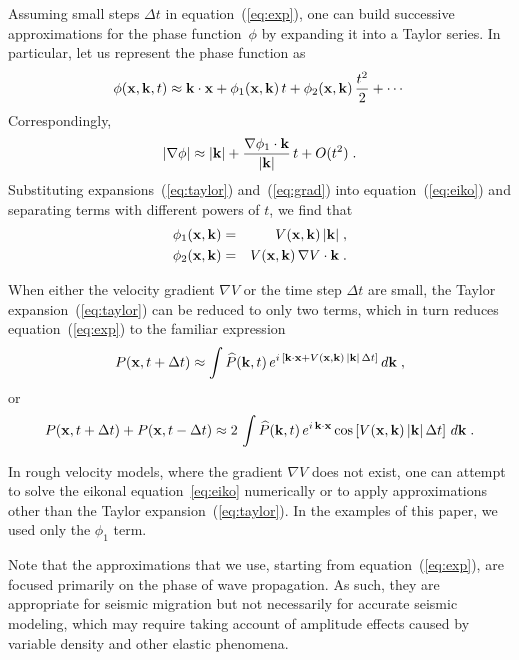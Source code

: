 Assuming small steps $\Delta t$ in equation~(\ref{eq:exp}), one can
build successive approximations for the phase function~$\phi$ by
expanding it into a Taylor series. In particular, let us represent the
phase function as
\begin{equation}
  \label{eq:taylor}
  \phi(\mathbf{x},\mathbf{k},t) \approx  \mathbf{k} \cdot \mathbf{x} + \phi_1(\mathbf{x},\mathbf{k})\,t + \phi_2(\mathbf{x},\mathbf{k})\,\frac{t^2}{2} + \cdots
\end{equation}
Correspondingly,
\begin{equation}
  \label{eq:grad}
  \left|\nabla \phi\right| \approx |\mathbf{k}| + \frac{\nabla \phi_1 \cdot
    \mathbf{k}}{|\mathbf{k}|}\,t + O(t^2)\;.
\end{equation}
Substituting expansions~(\ref{eq:taylor}) and~(\ref{eq:grad}) into equation~(\ref{eq:eiko}) and
separating terms with different powers of $t$, we find that
\begin{eqnarray}
  \label{eq:phi1}
  \phi_1(\mathbf{x},\mathbf{k}) & = & V(\mathbf{x},\mathbf{k})\,|\mathbf{k}|\;, \\
  \label{eq:phi2}
  \phi_2(\mathbf{x},\mathbf{k}) & = & V(\mathbf{x},\mathbf{k})\,\nabla V \cdot \mathbf{k}\;.
\end{eqnarray}

When either the velocity gradient $\nabla V$ or the time step $\Delta
t$ are small, the Taylor expansion~(\ref{eq:taylor}) can be reduced to
only two terms, which in turn reduces equation~(\ref{eq:exp}) to the
familiar expression \cite[]{etgen}
\begin{equation}
  \label{eq:expf}
  P(\mathbf{x},t+\Delta t) \approx \int
  \widehat{P}(\mathbf{k},t)\,e^{i\,\left[\mathbf{k} \cdot \mathbf{x}+V(\mathbf{x},\mathbf{k})\,|\mathbf{k}|\,\Delta t\right]}\,d\mathbf{k}\;,
\end{equation}
or
\begin{equation}
P(\mathbf{x},t+\Delta t) + P(\mathbf{x},t-\Delta t) \approx 
    2\,\int \widehat{P}(\mathbf{k},t)\,e^{i\,\mathbf{k} \cdot \mathbf{x}}\cos\left[V(\mathbf{x},\mathbf{k})\,|\mathbf{k}|\,\Delta t\right]\,d\mathbf{k}\;.
\label{eq:cosf}
\end{equation}

In rough velocity models, where the gradient $\nabla V$ does not
exist, one can attempt to solve the eikonal
equation~\ref{eq:eiko} numerically or to apply approximations other than
the Taylor expansion~(\ref{eq:taylor}). In the examples of this
paper, we used only the $\phi_1$ term.

Note that the approximations that we use, starting from
equation~(\ref{eq:exp}), are focused primarily on the phase of wave
propagation. As such, they are appropriate for seismic migration but
not necessarily for accurate seismic modeling, which may require
taking account of amplitude effects caused by variable density and
other elastic phenomena.

